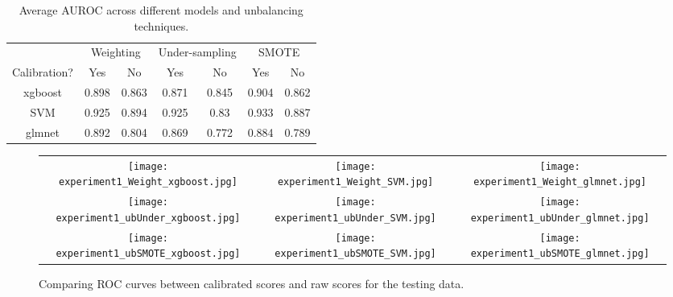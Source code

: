 \documentclass{article} %
\begin{document}
\begin{table}[htbp]
\centering
\caption{Average AUROC across different models and unbalancing techniques.}\label{tbl:stratasample}
\begin{tabular}{ccccccc}
\hline
& \multicolumn{2}{c}{Weighting} & \multicolumn{2}{c}{Under-sampling} & \multicolumn{2}{c}{SMOTE}\\
Calibration?& Yes & No & Yes & No & Yes & No\\\hline
xgboost & 0.898 & 0.863 & 0.871 & 0.845 & 0.904 & 0.862\\
SVM & 0.925 & 0.894 & 0.925 & 0.83 & 0.933 & 0.887\\
glmnet & 0.892 & 0.804 & 0.869 & 0.772 & 0.884 & 0.789\\\hline
\end{tabular}
\end{table}

\begin{figure}
\centering
\begin{tabular}{ccc}
\texttt{[image: experiment1\_Weight\_xgboost.jpg]} & 
\texttt{[image: experiment1\_Weight\_SVM.jpg]} &
\texttt{[image: experiment1\_Weight\_glmnet.jpg]} \\
\texttt{[image: experiment1\_ubUnder\_xgboost.jpg]} & 
\texttt{[image: experiment1\_ubUnder\_SVM.jpg]} &
\texttt{[image: experiment1\_ubUnder\_glmnet.jpg]} \\
\texttt{[image: experiment1\_ubSMOTE\_xgboost.jpg]} & 
\texttt{[image: experiment1\_ubSMOTE\_SVM.jpg]} &
\texttt{[image: experiment1\_ubSMOTE\_glmnet.jpg]} \\
\end{tabular}
\caption{Comparing ROC curves between calibrated scores and raw scores for the testing data.}\label{fig:stratasampling}
\end{figure}
\end{document}

